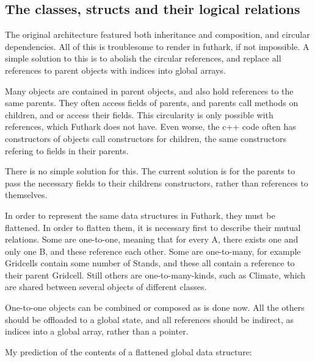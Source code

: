 \subsection{The classes, structs and their logical relations}
The original architecture featured both inheritance and composition, and circular dependencies. All of this is troublesome to render in futhark, if not impossible. A simple solution to this is to abolish the circular references, and replace all references to parent objects with indices into global arrays.

Many objects are contained in parent objects, and also hold references to the same parents. They often access fields of parents, and parents call methods on children, and or access their fields. This circularity is only possible with references, which Futhark does not have. Even worse, the c++ code often has constructors of objects call constructors for children, the same constructors refering to fields in their parents.

There is no simple solution for this. The current solution is for the parents to pass the necessary fields to their childrens constructors, rather than references to themselves.

In order to represent the same data structures in Futhark, they must be flattened. In order to flatten them, it is necessary first to describe their mutual relations. Some are one-to-one, meaning that for every A, there exists one and only one B, and these reference each other. Some are one-to-many, for example Gridcells contain some number of Stands, and these all contain a reference to their parent Gridcell. Still others are one-to-many-kinds, such as Climate, which are shared between several objects of different classes.

One-to-one objects can be combined or composed as is done now. All the others should be offloaded to a global state, and all references should be indirect, as indices into a global array, rather than a pointer.

My prediction of the contents of a flattened global data structure:

